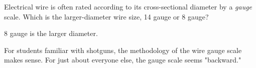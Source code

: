 

Electrical wire is often rated according to its cross-sectional diameter by a {\it gauge} scale.  Which is the larger-diameter wire size, 14 gauge or 8 gauge?







8 gauge is the larger diameter.







For students familiar with shotguns, the methodology of the wire gauge scale makes sense.  For just about everyone else, the gauge scale seems "backward."




